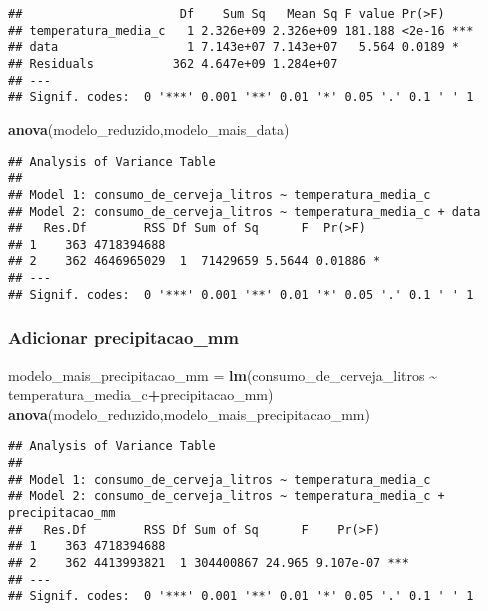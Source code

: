 \documentclass[
]{article}
\newenvironment{Shaded}{\begin{snugshade}}{\end{snugshade}}
\newcommand{\FunctionTok}[1]{\textcolor[rgb]{0.13,0.29,0.53}{\textbf{#1}}}
\newcommand{\NormalTok}[1]{#1}
\newcommand{\OtherTok}[1]{\textcolor[rgb]{0.56,0.35,0.01}{#1}}
\newcommand{\SpecialCharTok}[1]{\textcolor[rgb]{0.81,0.36,0.00}{\textbf{#1}}}
\begin{document}
\begin{verbatim}
##                      Df    Sum Sq   Mean Sq F value Pr(>F)    
## temperatura_media_c   1 2.326e+09 2.326e+09 181.188 <2e-16 ***
## data                  1 7.143e+07 7.143e+07   5.564 0.0189 *  
## Residuals           362 4.647e+09 1.284e+07                   
## ---
## Signif. codes:  0 '***' 0.001 '**' 0.01 '*' 0.05 '.' 0.1 ' ' 1
\end{verbatim}

\begin{Shaded}
\begin{Highlighting}[]
\FunctionTok{anova}\NormalTok{(modelo\_reduzido,modelo\_mais\_data)}
\end{Highlighting}
\end{Shaded}

\begin{verbatim}
## Analysis of Variance Table
## 
## Model 1: consumo_de_cerveja_litros ~ temperatura_media_c
## Model 2: consumo_de_cerveja_litros ~ temperatura_media_c + data
##   Res.Df        RSS Df Sum of Sq      F  Pr(>F)  
## 1    363 4718394688                              
## 2    362 4646965029  1  71429659 5.5644 0.01886 *
## ---
## Signif. codes:  0 '***' 0.001 '**' 0.01 '*' 0.05 '.' 0.1 ' ' 1
\end{verbatim}

\hypertarget{adicionar-precipitacao_mm}{%
\subsubsection{Adicionar
precipitacao\_mm}\label{adicionar-precipitacao_mm}}

\begin{Shaded}
\begin{Highlighting}[]
\NormalTok{modelo\_mais\_precipitacao\_mm }\OtherTok{=} \FunctionTok{lm}\NormalTok{(consumo\_de\_cerveja\_litros }\SpecialCharTok{\textasciitilde{}} 
\NormalTok{                                   temperatura\_media\_c}\SpecialCharTok{+}\NormalTok{precipitacao\_mm)}
\FunctionTok{anova}\NormalTok{(modelo\_reduzido,modelo\_mais\_precipitacao\_mm)}
\end{Highlighting}
\end{Shaded}

\begin{verbatim}
## Analysis of Variance Table
## 
## Model 1: consumo_de_cerveja_litros ~ temperatura_media_c
## Model 2: consumo_de_cerveja_litros ~ temperatura_media_c + precipitacao_mm
##   Res.Df        RSS Df Sum of Sq      F    Pr(>F)    
## 1    363 4718394688                                  
## 2    362 4413993821  1 304400867 24.965 9.107e-07 ***
## ---
## Signif. codes:  0 '***' 0.001 '**' 0.01 '*' 0.05 '.' 0.1 ' ' 1
\end{verbatim}
\end{document}
